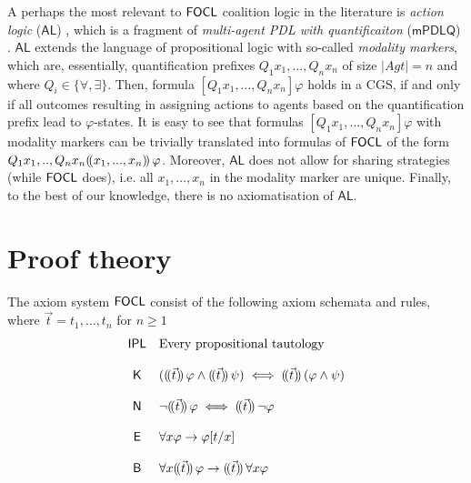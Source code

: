 \documentclass{article}
\theoremstyle{definition}
\begin{document}
A perhaps the most relevant to $\mathsf{FOCL}$ coalition logic in the literature is \textit{action logic} ($\mathsf{AL}$) \cite{borgo07}, which is a fragment of \textit{multi-agent PDL with quantificaiton} ($\mathsf{mPDLQ}$) \cite{borgo05}. $\mathsf{AL}$ extends the language of propositional logic with so-called \textit{modality markers}, which are, essentially, quantification prefixes $Q_1 x_1, ..., Q_n x_n$ of size $|Agt| = n$ and where $Q_i \in \{\forall, \exists\}$. Then, formula $[Q_1 x_1, ..., Q_n x_n]\varphi$ holds in a CGS, if and only if all outcomes resulting in assigning actions to agents based on the quantification prefix lead to $\varphi$-states. It is easy to see that formulas $[Q_1 x_1, ..., Q_n x_n]\varphi$ with modality markers can be trivially translated into formulas of $\mathsf{FOCL}$ of the form $Q_1 x_1, .., Q_n x_n (\!( x_1, ..., x_n )\!)\, \varphi$. Moreover, $\mathsf{AL}$ does not allow for sharing strategies (while $\mathsf{FOCL}$ does), i.e. all $x_1, ..., x_n$ in the modality marker are unique. Finally, to the best of our knowledge, there is no axiomatisation of  $\mathsf{AL}$.


\section{Proof theory}


The axiom system $\CSL$ consist of the following axiom schemata and rules, where $\vec{t}=t_1,\ldots,t_n$ for $n\geq 1$
$$
\begin{array}{c
l}

    \mathsf{IPL}  & \text{Every propositional tautology}  
  \\
  \\
     \mathsf{K} & ( \assign{\vec{t}} \varphi \land \assign{\vec{t}}\psi) \iff \assign{\vec{t}}(\varphi \land \psi )
   \\
   \\
   \mathsf{\mathsf{N} } & \neg \assign{\Vec{t}}\varphi \iff \assign{\vec{t }}\neg \varphi 

   \\
   \\
   \mathsf{E} & \forall x \varphi \to \varphi[t/x]
\\
\\
\mathsf{B} & \forall x \assign{\vec t} \varphi \imp \assign{\vec t} \forall x \varphi \qquad %
\end{array}$$
\end{document}

